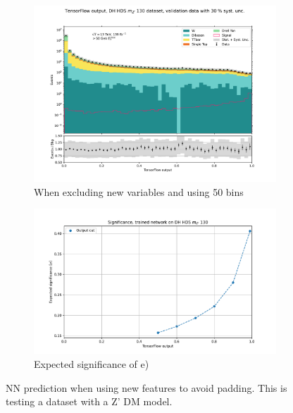 \documentclass[14pt, a4paper]{book}
\begin{document}
\begin{figure}[!ht]
\begin{subfigure}[b]{0.49\textwidth}
      \includegraphics[width=1\textwidth]{no_pad/VAL.pdf}
      \caption{When excluding new variables and using 50 bins}
   \end{subfigure}
   \hfill
   \begin{subfigure}[b]{0.49\textwidth}
      \centering
      \includegraphics[width=1\textwidth]{no_pad/EXP_SIG.pdf}
      \caption{Expected significance of e)}
   \end{subfigure}
   \caption[Network performace when testing new variables to avoid padding]{NN prediction when using new features to avoid padding. This is testing a dataset with a Z' DM model.}\label{fig:New_var_pad}
\end{figure}
\clearpage
\end{document}
